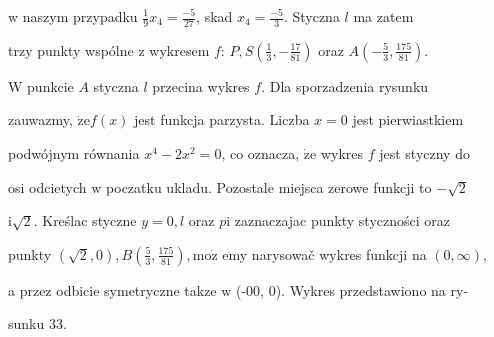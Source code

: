 \documentclass[a4paper,12pt]{article}
\begin{document}
$\mathrm{w}$ naszym przypadku $\displaystyle \frac{1}{9}x_{4} = \displaystyle \frac{-5}{27}$, skad $x_{4} = \displaystyle \frac{-5}{3}$. Styczna $l$ ma zatem

trzy punkty wspólne $\mathrm{z}$ wykresem $f$: $P, S(\displaystyle \frac{1}{3},-\frac{17}{81})$ oraz $A(-\displaystyle \frac{5}{3},\frac{175}{81}).$

$\mathrm{W}$ punkcie $A$ styczna $l$ przecina wykres $f$. Dla sporzadzenia rysunku

zauwazmy, $\dot{\mathrm{z}}\mathrm{e}f(x)$ jest funkcja parzysta. Liczba $x=0$ jest pierwiastkiem

podwójnym równania $x^{4}-2x^{2}=0$, co oznacza, $\dot{\mathrm{z}}\mathrm{e}$ wykres $f$ jest styczny do

osi odcietych $\mathrm{w}$ poczatku ukladu. Pozostale miejsca zerowe funkcji to $-\sqrt{2}$

$\mathrm{i}\sqrt{2}$. Kreślac styczne $y=0, l$ oraz $p\mathrm{i}$ zaznaczajac punkty styczności oraz

punkty $(\sqrt{2},0), B(\displaystyle \frac{5}{3},\frac{175}{81}), \mathrm{m}\mathrm{o}\dot{\mathrm{z}}$ emy narysowač wykres funkcji na $(0,\infty),$

a przez odbicie symetryczne takze $\mathrm{w}$ (-00, 0). Wykres przedstawiono na ry-

sunku 33.
\end{document}
